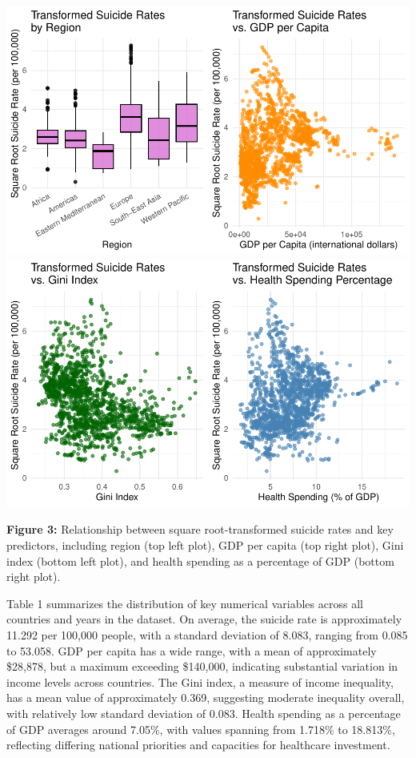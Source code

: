 \documentclass[
]{article}
\begin{document}
\includegraphics{final_report_files/figure-latex/suicide-against-numeric-transformed-1.pdf}
\includegraphics{final_report_files/figure-latex/suicide-against-numeric-transformed-2.pdf}

\textbf{Figure 3:} Relationship between square root-transformed suicide
rates and key predictors, including region (top left plot), GDP per
capita (top right plot), Gini index (bottom left plot), and health
spending as a percentage of GDP (bottom right plot).

\newpage

Table 1 summarizes the distribution of key numerical variables across
all countries and years in the dataset. On average, the suicide rate is
approximately 11.292 per 100,000 people, with a standard deviation of
8.083, ranging from 0.085 to 53.058. GDP per capita has a wide range,
with a mean of approximately \$28,878, but a maximum exceeding
\$140,000, indicating substantial variation in income levels across
countries. The Gini index, a measure of income inequality, has a mean
value of approximately 0.369, suggesting moderate inequality overall,
with relatively low standard deviation of 0.083. Health spending as a
percentage of GDP averages around 7.05\%, with values spanning from
1.718\% to 18.813\%, reflecting differing national priorities and
capacities for healthcare investment.
\end{document}
